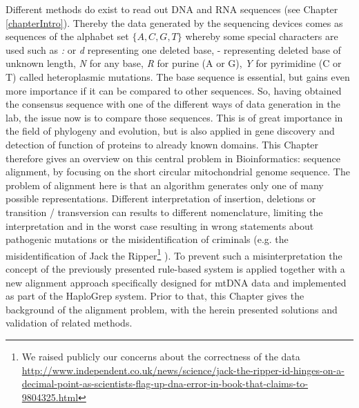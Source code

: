 Different methods do exist to read out DNA and RNA sequences (see Chapter \ref{chapterIntro}). Thereby the data generated by the sequencing devices comes as sequences of the alphabet set \(\{A, C, G, T\}\) whereby some special characters are used such as \textit{:} or \textit{d} representing one deleted base, - representing deleted base of unknown length, \textit{N} for any base, \textit{R} for purine (A or G), \textit{Y} for pyrimidine (C or T) called heteroplasmic mutations. The base sequence is essential, but gains even more importance if it can be compared to other sequences. So, having obtained the consensus sequence with one of the different ways of data generation in the lab, the issue now is to compare those sequences. This is of great importance in the field of phylogeny and evolution, but is also applied in gene discovery and detection of function of proteins to already known domains. This Chapter therefore gives an overview on this central problem in Bioinformatics: sequence alignment, by focusing on the short circular mitochondrial genome sequence. The problem of alignment here is that an algorithm generates only one of many possible representations. Different interpretation of insertion, deletions or transition / transversion can results to different nomenclature, limiting the interpretation and in the worst case resulting in wrong statements about pathogenic mutations or the misidentification of criminals (e.g. the misidentification of Jack the Ripper\footnote{ We raised publicly our concerns about the correctness of the data \url{http://www.independent.co.uk/news/science/jack-the-ripper-id-hinges-on-a-decimal-point-as-scientists-flag-up-dna-error-in-book-that-claims-to-9804325.html}} ). To prevent such a misinterpretation the concept of the previously presented rule-based system is applied together with a new alignment approach specifically designed for mtDNA data and implemented as part of the HaploGrep system. Prior to that, this Chapter gives the background of the alignment problem, with the herein presented solutions and validation of related methods.


